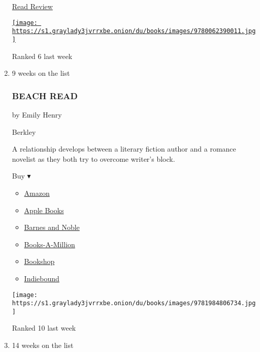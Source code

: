 \begin{enumerate}
  \href{https://www.nytimes3xbfgragh.onion/2019/07/18/books/review/laura-lippman-lady-in-the-lake.html}{Read
  Review}

  \href{https://www.nytimes3xbfgragh.onion/2019/07/18/books/review/laura-lippman-lady-in-the-lake.html}{\texttt{[image: https://s1.graylady3jvrrxbe.onion/du/books/images/9780062390011.jpg]}}

  Ranked 6 last week
\item
  9 weeks on the list

  \hypertarget{beach-read}{%
  \subsubsection{BEACH READ}\label{beach-read}}

  by Emily Henry

  Berkley

  A relationship develops between a literary fiction author and a
  romance novelist as they both try to overcome writer's block.

  Buy ▾

  \begin{itemize}
  \tightlist
  \item
    \href{https://www.amazon.com/dp/1984806734?tag=NYTBSREV-20\&tag=NYTBS-20}{Amazon}
  \item
    \href{https://du-gae-books-dot-nyt-du-prd.appspot.com/buy?title=BEACH+READ\&author=Emily+Henry}{Apple
    Books}
  \item
    \href{https://www.anrdoezrs.net/click-7990613-11819508?url=https\%3A\%2F\%2Fwww.barnesandnoble.com\%2Fw\%2F\%3Fean\%3D9781984806734}{Barnes
    and Noble}
  \item
    \href{https://www.anrdoezrs.net/click-7990613-35140?url=https\%3A\%2F\%2Fwww.booksamillion.com\%2Fp\%2FBEACH\%2BREAD\%2FEmily\%2BHenry\%2F9781984806734}{Books-A-Million}
  \item
    \href{https://bookshop.org/a/3546/9781984806734}{Bookshop}
  \item
    \href{https://www.indiebound.org/book/9781984806734?aff=NYT}{Indiebound}
  \end{itemize}

  \texttt{[image: https://s1.graylady3jvrrxbe.onion/du/books/images/9781984806734.jpg]}

  Ranked 10 last week
\item
  \href{https://www.nytimes3xbfgragh.onion/2018/05/28/books/review/circe-madeline-miller.html}{}

  14 weeks on the list


\end{enumerate}
